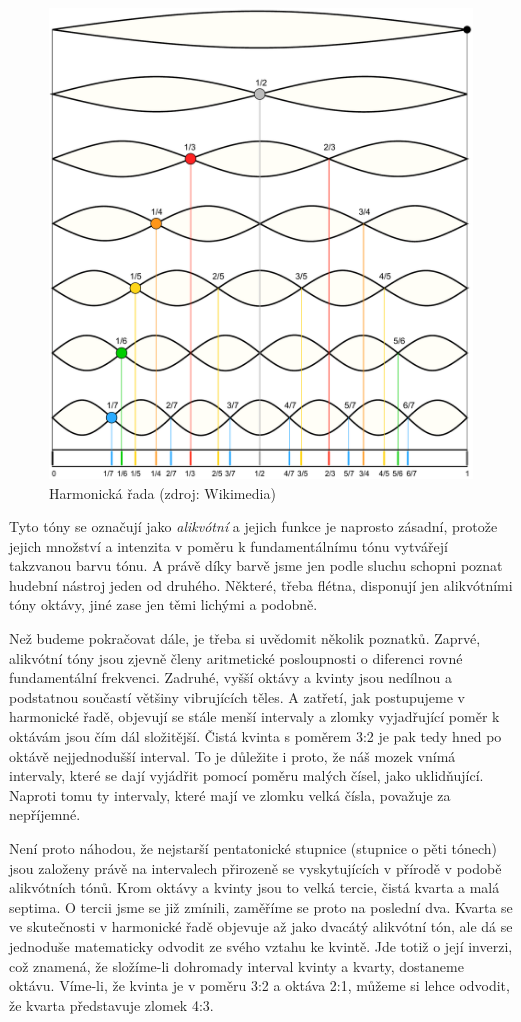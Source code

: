 \documentclass[12pt]{article}
\begin{document}
\begin{figure}
\centering
\includegraphics[width = .75 \textwidth]{harmonics.pdf}
\caption{Harmonická řada (zdroj: Wikimedia)}
\label{fig:harmonics}
\end{figure}

Tyto tóny se označují jako \emph{alikvótní} a jejich funkce je naprosto zásadní, protože jejich množství a intenzita v poměru k fundamentálnímu tónu vytvářejí takzvanou barvu tónu. A právě díky barvě jsme jen podle sluchu schopni poznat hudební nástroj jeden od druhého. Některé, třeba flétna, disponují jen alikvótními tóny oktávy, jiné zase jen těmi lichými a podobně.

Než budeme pokračovat dále, je třeba si uvědomit několik poznatků. Zaprvé, alikvótní tóny jsou zjevně členy aritmetické posloupnosti o diferenci rovné fundamentální frekvenci. Zadruhé, vyšší oktávy a kvinty jsou nedílnou a podstatnou součastí většiny vibrujících těles. A zatřetí, jak postupujeme v harmonické řadě, objevují se stále menší intervaly a zlomky vyjadřující poměr k oktávám jsou čím dál složitější. Čistá kvinta s poměrem 3:2 je pak tedy hned po oktávě nejjednodušší interval. To je důležite i proto, že náš mozek vnímá intervaly, které se dají vyjádřit pomocí poměru malých čísel, jako uklidňující. Naproti tomu ty intervaly, které mají ve zlomku velká čísla, považuje za nepříjemné.

Není proto náhodou, že nejstarší pentatonické stupnice (stupnice o pěti tónech) jsou založeny právě na intervalech přirozeně se vyskytujících v přírodě v podobě alikvótních tónů. Krom oktávy a kvinty jsou to velká tercie, čistá kvarta a malá septima. O tercii jsme se již zmínili, zaměříme se proto na poslední dva. Kvarta se ve skutečnosti v harmonické řadě objevuje až jako dvacátý alikvótní tón, ale dá se jednoduše matematicky odvodit ze svého vztahu ke kvintě. Jde totiž o její inverzi, což znamená, že složíme-li dohromady interval kvinty a kvarty, dostaneme oktávu. Víme-li, že kvinta je v poměru 3:2 a oktáva 2:1, můžeme si lehce odvodit, že kvarta představuje zlomek 4:3.
\end{document}
